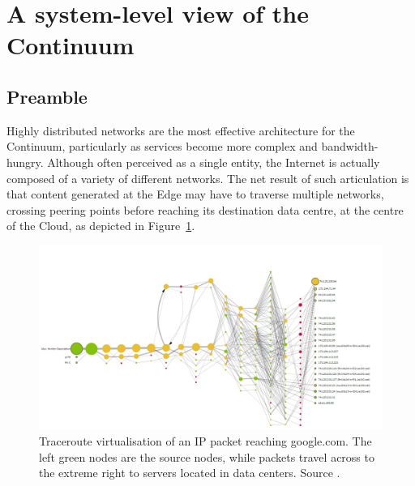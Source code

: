\section{A system-level view of the Continuum}
\label{sec:technicals}

\subsection{Preamble}
Highly distributed networks are the most effective architecture for the Continuum, particularly as services become more complex and bandwidth-hungry. Although often perceived as a single entity, the Internet is actually composed of a variety of different networks. 
The net result of such articulation is that content generated at the Edge may have to traverse multiple networks, crossing peering points before reaching its destination data centre, at the centre of the Cloud, as depicted in Figure~\ref{fig:traceroute}.

\begin{figure}[ht]
\centering
\includegraphics[width=\columnwidth]{figures/traceroute}
\caption{Traceroute virtualisation of an IP packet reaching google.com. The left green nodes are the source nodes, while packets travel across to the extreme right to servers located in data centers. Source \cite{traceroute}.}
\label{fig:traceroute}
\end{figure}


